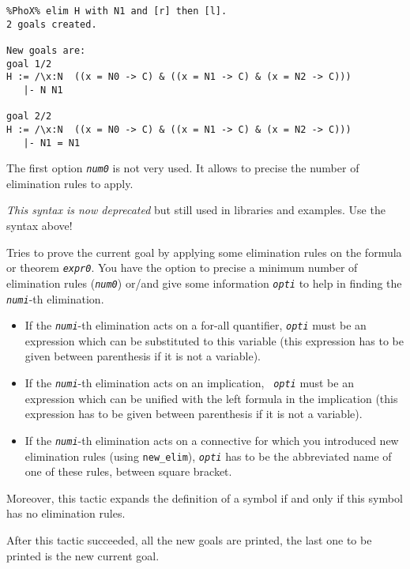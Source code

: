 \begin{description}
\begin{verbatim}
%PhoX% elim H with N1 and [r] then [l].  
2 goals created.

New goals are:
goal 1/2
H := /\x:N  ((x = N0 -> C) & ((x = N1 -> C) & (x = N2 -> C)))
   |- N N1

goal 2/2
H := /\x:N  ((x = N0 -> C) & ((x = N1 -> C) & (x = N2 -> C)))
   |- N1 = N1
\end{verbatim}



The first option {\tt{\em num0}} is not very used. It allows to precise
the number of elimination rules to apply.

\item[{\tt elim \{{\em num0}\} \{-{\em num1} {\em opt1}\} ... \{-{\em numn}
  {\em optn}\} {\em expr0}.}\footnote{Curly braces denote an optional
  argument. You should note type them.}]

{\em This syntax is now deprecated} but still used in libraries and
examples. Use the syntax above!

  Tries to prove the current goal by applying some elimination rules on the
  formula or theorem {\tt\em expr0}. You have the option to precise a minimum
  number of
  elimination rules ({\tt\em num0}) or/and give some information {\tt\em opti}
  to help in finding the {\tt\em numi}-th elimination. 
  \begin{itemize}
  \item If the {\tt\em numi}-th elimination acts on a for-all quantifier,
    {\tt\em opti} must be an expression which can be substituted to this
    variable (this expression has to be given between parenthesis if it is not
    a variable).
  \item If the {\tt\em numi}-th elimination acts on an implication, {\tt\em
      opti} must be an expression which can be unified with the left formula
    in the implication (this expression has to be given between parenthesis if
    it is not a variable).
  \item If the {\tt\em numi}-th elimination acts on a connective for which you
    introduced new elimination rules (using {\tt new\_elim}), {\tt\em opti}
    has to be the abbreviated name of one of these rules, between square
    bracket.
  \end{itemize}
  
  Moreover, this tactic expands the definition of a symbol if and only if this
  symbol has no elimination rules.

  After this tactic succeeded, all the new goals are printed, the last
  one to be printed is the new current goal.


\end{description}
